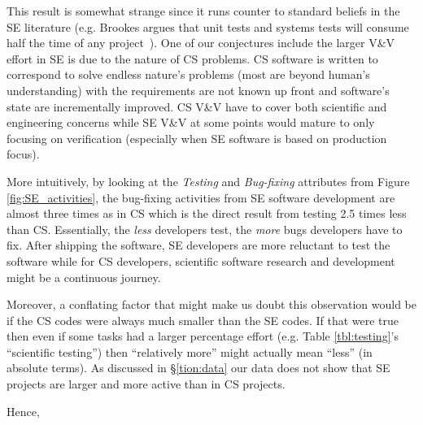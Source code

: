 \documentclass[sigconf]{acmart}
\begin{document}
This result is somewhat strange since it runs counter to standard beliefs in the SE literature (e.g. Brookes argues that unit tests and systems tests will consume half the time of any project~\cite{brooks1995mythical}). One of our conjectures include the larger V\&V effort in SE  is due to the nature of CS problems. CS software is written to correspond to solve endless nature's problems (most are beyond human's understanding) with the requirements are not known up front and software's state are incrementally improved. CS V\&V have to cover both scientific and engineering concerns while SE V\&V at some points would mature to only focusing on verification (especially when SE software is based on production focus). 

More intuitively, by looking at the \textit{Testing} and \textit{Bug-fixing} attributes from Figure \ref{fig:SE_activities}, the bug-fixing activities from SE software development are almost three times as in CS which is the direct result from testing 2.5 times less than CS. Essentially, the \textit{less} developers test, the \textit{more} bugs developers have to fix. After shipping the software, SE developers are more reluctant to test the software while for CS developers, scientific software research and development might be a continuous journey.

Moreover, a conflating factor that might make us doubt this observation would be if the CS codes were always much smaller than the SE codes. If that were true then even if some tasks had a larger percentage effort 
(e.g. Table \ref{tbl:testing}'s ``scientific testing'') then  ``relatively more'' might actually
mean ``less'' (in absolute terms). 
As discussed in \S\ref{tion:data} our data does not show that  SE projects are larger and more active
than in CS projects.

Hence, 

\end{document}
